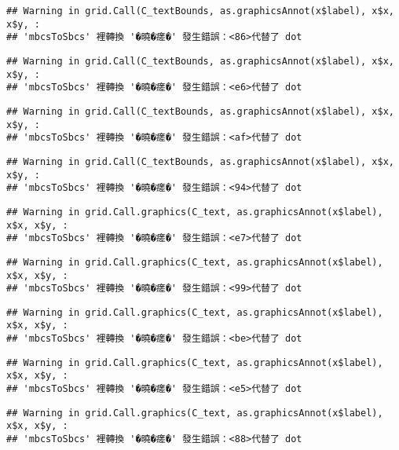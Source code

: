 \documentclass[
]{article}
\begin{document}
\begin{verbatim}
## Warning in grid.Call(C_textBounds, as.graphicsAnnot(x$label), x$x, x$y, :
## 'mbcsToSbcs' 裡轉換 '�曉�瘥�' 發生錯誤：<86>代替了 dot
\end{verbatim}

\begin{verbatim}
## Warning in grid.Call(C_textBounds, as.graphicsAnnot(x$label), x$x, x$y, :
## 'mbcsToSbcs' 裡轉換 '�曉�瘥�' 發生錯誤：<e6>代替了 dot
\end{verbatim}

\begin{verbatim}
## Warning in grid.Call(C_textBounds, as.graphicsAnnot(x$label), x$x, x$y, :
## 'mbcsToSbcs' 裡轉換 '�曉�瘥�' 發生錯誤：<af>代替了 dot
\end{verbatim}

\begin{verbatim}
## Warning in grid.Call(C_textBounds, as.graphicsAnnot(x$label), x$x, x$y, :
## 'mbcsToSbcs' 裡轉換 '�曉�瘥�' 發生錯誤：<94>代替了 dot
\end{verbatim}

\begin{verbatim}
## Warning in grid.Call.graphics(C_text, as.graphicsAnnot(x$label), x$x, x$y, :
## 'mbcsToSbcs' 裡轉換 '�曉�瘥�' 發生錯誤：<e7>代替了 dot
\end{verbatim}

\begin{verbatim}
## Warning in grid.Call.graphics(C_text, as.graphicsAnnot(x$label), x$x, x$y, :
## 'mbcsToSbcs' 裡轉換 '�曉�瘥�' 發生錯誤：<99>代替了 dot
\end{verbatim}

\begin{verbatim}
## Warning in grid.Call.graphics(C_text, as.graphicsAnnot(x$label), x$x, x$y, :
## 'mbcsToSbcs' 裡轉換 '�曉�瘥�' 發生錯誤：<be>代替了 dot
\end{verbatim}

\begin{verbatim}
## Warning in grid.Call.graphics(C_text, as.graphicsAnnot(x$label), x$x, x$y, :
## 'mbcsToSbcs' 裡轉換 '�曉�瘥�' 發生錯誤：<e5>代替了 dot
\end{verbatim}

\begin{verbatim}
## Warning in grid.Call.graphics(C_text, as.graphicsAnnot(x$label), x$x, x$y, :
## 'mbcsToSbcs' 裡轉換 '�曉�瘥�' 發生錯誤：<88>代替了 dot
\end{verbatim}
\end{document}
